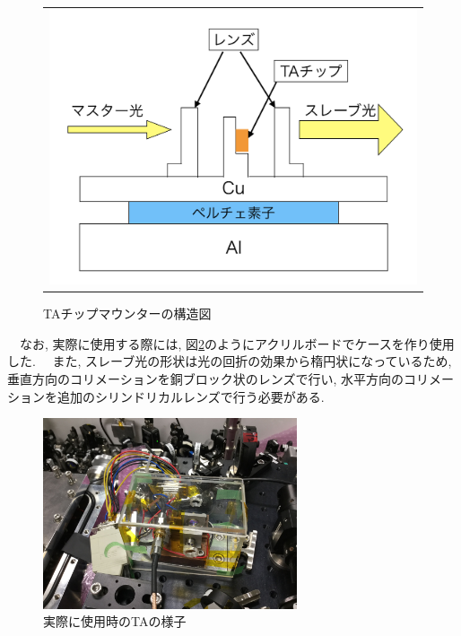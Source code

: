 \documentclass[uplatex, dvipdfmx, a4paper, report, papersize, 11pt]{jsbook}
\begin{document}
\begin{figure}[htpb]
\begin{tabular}{c}
      \begin{minipage}{0.50\hsize}
        \centering
          \includegraphics[keepaspectratio,  scale=0.35,  angle=0]
                          {figures/chapter4/TA_mounter_structure.png}
                          \caption{TAチップマウンターの構造図}
                          \label{TA_mounter_structure}
      \end{minipage}

    \end{tabular}
\end{figure}
\newpage
　なお, 実際に使用する際には, 図\ref{TA_case}のようにアクリルボードでケースを作り使用した. 　また, スレーブ光の形状は光の回折の効果から楕円状になっているため, 垂直方向のコリメーションを銅ブロック状のレンズで行い, 水平方向のコリメーションを追加のシリンドリカルレンズで行う必要がある. \\
\begin{figure}[htbp]
 \begin{center}
  \includegraphics[width=75mm]{figures/chapter4/TA_case.jpg}
\end{center}
 \caption{実際に使用時のTAの様子}
 \label{TA_case}
\end{figure}
\end{document}
